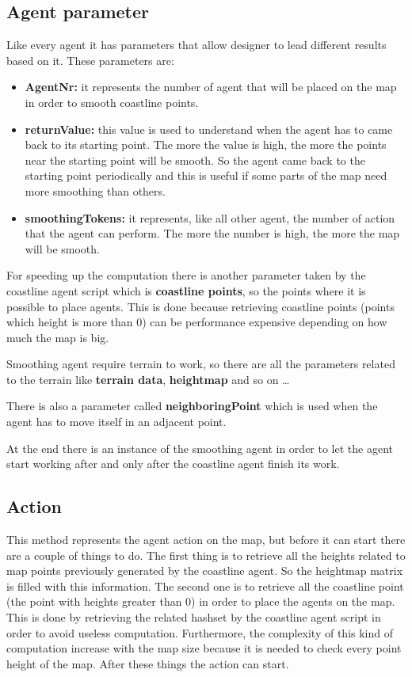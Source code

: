 \documentclass[12pt]{article}
\begin{document}
    \subsection{Agent parameter}
    Like every agent it has parameters that allow designer to lead different results based on it.
    These parameters are:
    \begin{itemize}
        \item \textbf{AgentNr:} it represents the number of agent that will be placed on the map in order to smooth coastline points.
        \item \textbf{returnValue:} this value is used to understand when the agent has to came back to its starting point. The more the value is high, the more
        the points near the starting point will be smooth. So the agent came back to the starting point periodically and this is useful if some parts of the map need 
        more smoothing than others.
        \item \textbf{smoothingTokens:} it represents, like all other agent, the number of action that the agent can perform. The more the number is high, the more the map will be smooth.
    \end{itemize}

    For speeding up the computation there is another parameter taken by the coastline agent script which is \textbf{coastline points}, so the points where it is possible to place agents.
    This is done because retrieving coastline points (points which height is more than 0) can be performance expensive depending on how much the map is big. 

    \noindent 
    Smoothing agent require terrain to work, so there are all the parameters related to the terrain like \textbf{terrain data}, \textbf{heightmap} and so on \dots

    \noindent
    There is also a parameter called \textbf{neighboringPoint} which is used when the agent has to move itself in an adjacent point.
    
    \noindent
    At the end there is an instance of the smoothing agent in order to let the agent start working after and only after the coastline agent finish its work.

    \subsection{Action}
    This method represents the agent action on the map, but before it can start there are a couple of things to do.
    The first thing is to retrieve all the heights related to map points previously generated by the coastline agent. So the heightmap matrix is filled with this information.
    The second one is to retrieve all the coastline point (the point with heights greater than 0) in order to place the agents on the map. This is done by retrieving the
    related hashset by the coastline agent script in order to avoid useless computation. Furthermore, the complexity of this kind of computation increase with the map size 
    because it is needed to check every point height of the map.
    After these things the action can start.
\end{document}
